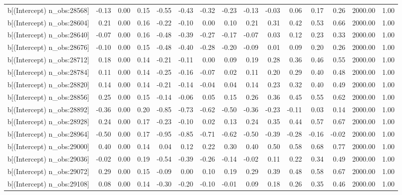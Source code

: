 \begin{table}[ht]
\begin{tabular}{rrrrrrrrrrrrrrr}
  b[(Intercept) n\_obs:28568] & -0.13 & 0.00 & 0.15 & -0.55 & -0.43 & -0.32 & -0.23 & -0.13 & -0.03 & 0.06 & 0.17 & 0.26 & 2000.00 & 1.00 \\ 
  b[(Intercept) n\_obs:28604] & 0.21 & 0.00 & 0.16 & -0.22 & -0.10 & 0.00 & 0.10 & 0.21 & 0.31 & 0.42 & 0.53 & 0.66 & 2000.00 & 1.00 \\ 
  b[(Intercept) n\_obs:28640] & -0.07 & 0.00 & 0.16 & -0.48 & -0.39 & -0.27 & -0.17 & -0.07 & 0.03 & 0.12 & 0.23 & 0.33 & 2000.00 & 1.00 \\ 
  b[(Intercept) n\_obs:28676] & -0.10 & 0.00 & 0.15 & -0.48 & -0.40 & -0.28 & -0.20 & -0.09 & 0.01 & 0.09 & 0.20 & 0.26 & 2000.00 & 1.00 \\ 
  b[(Intercept) n\_obs:28712] & 0.18 & 0.00 & 0.14 & -0.21 & -0.11 & 0.00 & 0.09 & 0.19 & 0.28 & 0.36 & 0.46 & 0.55 & 2000.00 & 1.00 \\ 
  b[(Intercept) n\_obs:28784] & 0.11 & 0.00 & 0.14 & -0.25 & -0.16 & -0.07 & 0.02 & 0.11 & 0.20 & 0.29 & 0.40 & 0.48 & 2000.00 & 1.00 \\ 
  b[(Intercept) n\_obs:28820] & 0.14 & 0.00 & 0.14 & -0.21 & -0.14 & -0.04 & 0.04 & 0.14 & 0.23 & 0.32 & 0.40 & 0.49 & 2000.00 & 1.00 \\ 
  b[(Intercept) n\_obs:28856] & 0.25 & 0.00 & 0.15 & -0.14 & -0.06 & 0.05 & 0.15 & 0.26 & 0.36 & 0.45 & 0.55 & 0.62 & 2000.00 & 1.00 \\ 
  b[(Intercept) n\_obs:28892] & -0.36 & 0.00 & 0.20 & -0.85 & -0.73 & -0.62 & -0.50 & -0.36 & -0.23 & -0.11 & 0.03 & 0.14 & 2000.00 & 1.00 \\ 
  b[(Intercept) n\_obs:28928] & 0.24 & 0.00 & 0.17 & -0.23 & -0.10 & 0.02 & 0.13 & 0.24 & 0.35 & 0.44 & 0.57 & 0.67 & 2000.00 & 1.00 \\ 
  b[(Intercept) n\_obs:28964] & -0.50 & 0.00 & 0.17 & -0.95 & -0.85 & -0.71 & -0.62 & -0.50 & -0.39 & -0.28 & -0.16 & -0.02 & 2000.00 & 1.00 \\ 
  b[(Intercept) n\_obs:29000] & 0.40 & 0.00 & 0.14 & 0.04 & 0.12 & 0.22 & 0.30 & 0.40 & 0.50 & 0.58 & 0.68 & 0.77 & 2000.00 & 1.00 \\ 
  b[(Intercept) n\_obs:29036] & -0.02 & 0.00 & 0.19 & -0.54 & -0.39 & -0.26 & -0.14 & -0.02 & 0.11 & 0.22 & 0.34 & 0.49 & 2000.00 & 1.00 \\ 
  b[(Intercept) n\_obs:29072] & 0.29 & 0.00 & 0.15 & -0.09 & 0.00 & 0.10 & 0.19 & 0.29 & 0.39 & 0.48 & 0.58 & 0.67 & 2000.00 & 1.00 \\ 
  b[(Intercept) n\_obs:29108] & 0.08 & 0.00 & 0.14 & -0.30 & -0.20 & -0.10 & -0.01 & 0.09 & 0.18 & 0.26 & 0.35 & 0.46 & 2000.00 & 1.00 \\ 

\end{tabular}
\end{table}
